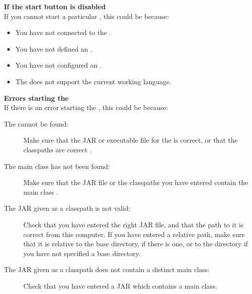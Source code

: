 % 
%
%
\textbf{If the start \gdaut{} button is disabled}\\
If you cannot start a particular \gdaut{}, this could be because:

\begin{itemize}
\item You have not connected to the \gdagent {}.
\item You have not defined an \gdaut{} .
\item You have not configured an \gdaut{} .
\item The \gdaut{} does not support the current working language. 
\end{itemize}

\textbf{Errors starting the \gdaut{}}\\
If there is an error starting the \gdaut{}, this could be because:
\begin{description}
\item [The \gdaut{} cannot be found:]{Make sure that the JAR or executable file for the \gdaut{} is correct, or that the classpaths are correct .}
\item [The main class has not been found:]{Make sure that the JAR file or the classpaths you have entered contain the main class . }
\item[The JAR given as a classpath is not valid:]{Check that you have entered the right JAR file, and that the path to it is correct from this computer. If you have entered a relative path, make sure that it is relative to the \gdaut{} base directory, if there is one, or to the \gdagent directory if you have not specified a \gdaut{} base directory. }
\item[The JAR given as a classpath does not contain a distinct  main 
class:]{Check that you have entered a JAR which contains a main class.}

\end{description}

